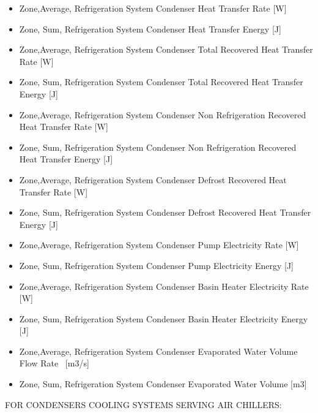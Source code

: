 \begin{itemize}
\item
  Zone,Average, Refrigeration System Condenser Heat Transfer Rate {[}W{]}
\item
  Zone, Sum, Refrigeration System Condenser Heat Transfer Energy {[}J{]}
\item
  Zone,Average, Refrigeration System Condenser Total Recovered Heat Transfer Rate {[}W{]}
\item
  Zone, Sum, Refrigeration System Condenser Total Recovered Heat Transfer Energy {[}J{]}
\item
  Zone,Average, Refrigeration System Condenser Non Refrigeration Recovered Heat Transfer Rate {[}W{]}
\item
  Zone, Sum, Refrigeration System Condenser Non Refrigeration Recovered Heat Transfer Energy {[}J{]}
\item
  Zone,Average, Refrigeration System Condenser Defrost Recovered Heat Transfer Rate {[}W{]}
\item
  Zone, Sum, Refrigeration System Condenser Defrost Recovered Heat Transfer Energy {[}J{]}
\item
  Zone,Average, Refrigeration System Condenser Pump Electricity Rate {[}W{]}
\item
  Zone, Sum, Refrigeration System Condenser Pump Electricity Energy {[}J{]}
\item
  Zone,Average, Refrigeration System Condenser Basin Heater Electricity Rate {[}W{]}
\item
  Zone, Sum, Refrigeration System Condenser Basin Heater Electricity Energy {[}J{]}
\item
  Zone,Average, Refrigeration System Condenser Evaporated Water Volume Flow Rate~ {[}m3/s{]}
\item
  Zone, Sum, Refrigeration System Condenser Evaporated Water Volume {[}m3{]}
\end{itemize}

FOR CONDENSERS COOLING SYSTEMS SERVING AIR CHILLERS:

